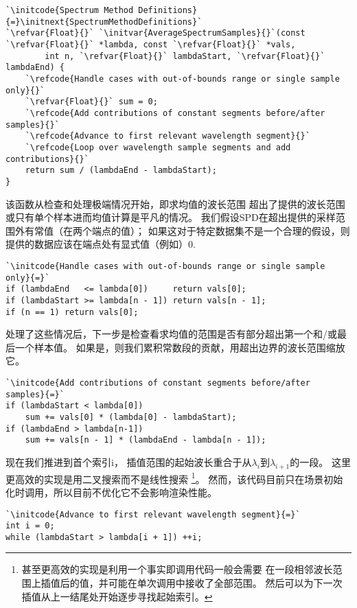 \begin{lstlisting}
`\initcode{Spectrum Method Definitions}{=}\initnext{SpectrumMethodDefinitions}`
`\refvar{Float}{}` `\initvar{AverageSpectrumSamples}{}`(const `\refvar{Float}{}` *lambda, const `\refvar{Float}{}` *vals,
        int n, `\refvar{Float}{}` lambdaStart, `\refvar{Float}{}` lambdaEnd) {
    `\refcode{Handle cases with out-of-bounds range or single sample only}{}`
    `\refvar{Float}{}` sum = 0;
    `\refcode{Add contributions of constant segments before/after samples}{}`
    `\refcode{Advance to first relevant wavelength segment}{}`
    `\refcode{Loop over wavelength sample segments and add contributions}{}`
    return sum / (lambdaEnd - lambdaStart);
}
\end{lstlisting}

该函数从检查和处理极端情况开始，即求均值的波长范围
超出了提供的波长范围或只有单个样本进而均值计算是平凡的情况。
我们假设SPD在超出提供的采样范围外有常值（在两个端点的值）；
如果这对于特定数据集不是一个合理的假设，则提供的数据应该在端点处有显式值（例如）0.
\begin{lstlisting}
`\initcode{Handle cases with out-of-bounds range or single sample only}{=}`
if (lambdaEnd   <= lambda[0])     return vals[0];
if (lambdaStart >= lambda[n - 1]) return vals[n - 1];
if (n == 1) return vals[0];
\end{lstlisting}

处理了这些情况后，下一步是检查看求均值的范围是否有部分超出第一个和/或最后一个样本值。
如果是，则我们累积常数段的贡献，用超出边界的波长范围缩放它。
\begin{lstlisting}
`\initcode{Add contributions of constant segments before/after samples}{=}`
if (lambdaStart < lambda[0])
    sum += vals[0] * (lambda[0] - lambdaStart);
if (lambdaEnd > lambda[n-1])
    sum += vals[n - 1] * (lambdaEnd - lambda[n - 1]);
\end{lstlisting}

现在我们推进到首个索引{\ttfamily i}，
插值范围的起始波长重合于从$\lambda_i$到$\lambda_{i+1}$的一段。
这里更高效的实现是用二叉搜索而不是线性搜索
\footnote{甚至更高效的实现是利用一个事实即调用代码一般会需要
    在一段相邻波长范围上插值后的值，并可能在单次调用中接收了全部范围。
    然后可以为下一次插值从上一结尾处开始逐步寻找起始索引。}。
然而，该代码目前只在场景初始化时调用，所以目前不优化它不会影响渲染性能。
\begin{lstlisting}
`\initcode{Advance to first relevant wavelength segment}{=}`
int i = 0;
while (lambdaStart > lambda[i + 1]) ++i;
\end{lstlisting}

